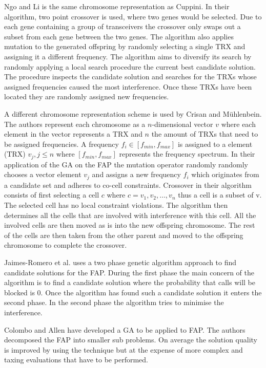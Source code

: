 Ngo and Li\cite{GANgoLi} is the same chromosome representation as Cuppini\cite{GACuppini}. In their algorithm, two point crossover is used, where two genes would be selected. Due to each gene containing a group of transceivers the crossover only swaps out a subset from each gene between the two genes. The algorithm also applies mutation to the generated offspring by randomly selecting a single TRX and assigning it a different frequency. The algorithm aims to diversify its search by randomly applying a local search procedure the current best candidate solution. The procedure inspects the candidate solution and searches for the TRXs whose assigned frequencies caused the most interference. Once these TRXs have been located they are randomly assigned new frequencies.

A different chromosome representation scheme is used by Crisan and M\"uhlenbein\cite{GACrisan}. The authors represent each chromosome as a $n$-dimensional vector $v$ where each element in the vector represents a TRX and $n$ the amount of TRXs that need to be assigned frequencies. A frequency $f_i \in [f_{min}, f_{max}]$ is assigned to a element (TRX) $v_j, j \le n$ where $[f_{min}, f_{max}]$ represents the frequency spectrum. In their application of the \gls{GA} on the FAP the mutation operator randomly randomly chooses a vector element $v_j$ and assigns a new frequency $f_i$ which originates from a candidate set and adheres to co-cell constraints. Crossover in their algorithm consists of first selecting a cell $c$ where $c = {v_1,v_2,\dots,v_n}$ thus a cell is a subset of v. The selected cell has no local constraint violations. The algorithm then determines all the cells that are involved with interference with this cell. All the involved cells are then moved as is into the new offspring chromosome. The rest of the cells are then taken from the other parent and moved to the offspring chromosome to complete the crossover.

Jaimes-Romero et al.\cite{GAJaimes} uses a two phase genetic algorithm approach to find candidate solutions for the \gls{FAP}. During the first phase the main concern of the algorithm is to find a candidate solution where the probability that calls will be blocked is 0. Once the algorithm has found such a candidate solution it enters the second phase. In the second phase the algorithm tries to minimise the interference. 

Colombo and Allen\cite{ProblemDecompMIFAP} have developed a \gls{GA} to be applied to \gls{FAP}. The authors decomposed the \gls{FAP} into smaller sub problems. On average the solution quality is improved by using the technique but at the expense of more complex and taxing evaluations that have to be performed\cite{ProblemDecompMIFAP}. 

